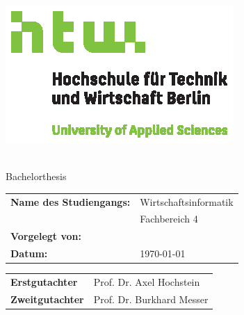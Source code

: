 \pagestyle{empty}

%
\begin{center}
	\includegraphics[scale=1]{images/htwlogo}\\[40pt]
	\begin{spacing}{1.5}
		\Large{\textbf{\thetitle}}
		\normalsize\\[10pt]
		\large Bachelorthesis
		\normalsize\\[40pt]
	\end{spacing}
\end{center}
\begin{center}
	\begin{tabular}{RL}
		\textbf{Name des Studiengangs:} & Wirtschaftsinformatik\\[0pt]
		& \footnotesize{Fachbereich 4}\\[20pt]
		\textbf{Vorgelegt von:} & \theauthor\\[20pt]
		\textbf{Datum:} & \today
	\end{tabular}
	\mbox{}\vfill
	\begin{tabular}{RL}
		\textbf{Erstgutachter} & Prof. Dr. Axel Hochstein \\
		\textbf{Zweitgutachter} & Prof. Dr. Burkhard Messer
	\end{tabular}
\end{center}
\clearpage

